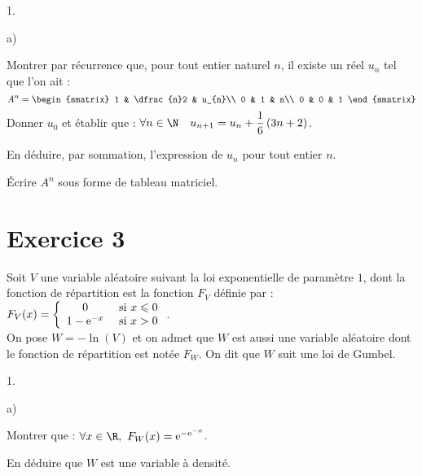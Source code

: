 \documentclass[11pt]{article}%
\begin{document}
\begin{noliste}{1.}
\item
  \begin{noliste}{a)}
    \setlength{\itemsep}{2mm}
  \item Montrer par récurrence que, pour tout entier naturel $n$, il
    existe un réel $u_{n}$ tel que l'on ait :
    \[
    A^{n} = 
    \begin{smatrix}
      1 & \dfrac{n}2 & u_{n}\\
      0 & 1 & n\\
      0 & 0 & 1
    \end{smatrix}
    \]
    Donner $u_{0}$ et établir que : \quad $\forall n \in \N \quad u_{n + 1}
    = u_{n} + \dfrac{1}{6}\left(3n + 2\right)$.
  \item En déduire, par sommation, l'expression de $u_{n}$ pour tout
    entier $n$.
  \item Écrire $A^{n}$ sous forme de tableau matriciel.
  \end{noliste}
\end{noliste}


\newpage


\section*{Exercice 3}

\noindent
Soit $V$ une variable aléatoire suivant la loi exponentielle de
paramètre $1$, dont la fonction de répartition est la fonction $F_{V}$
définie par : $F_{V}(x) = \left\{
\begin{array}{cl}
0 & \hbox{ si } x \leqslant 0\\
1-\text{e}^{-x} & \hbox{ si } x>0
\end{array}
\right.$.\\
On pose $W = -\ln(V)$ et on admet que $W$ est aussi une variable
aléatoire dont le fonction de répartition est notée $F_{W}$. On dit
que $W$ suit une loi de Gumbel.
\begin{noliste}{1.}
  \setlength{\itemsep}{4mm}
\item
  \begin{noliste}{a)}
    \setlength{\itemsep}{2mm}
  \item Montrer que : $\forall x \in \R, \ F_{W}(x) =
    \ee^{-\ee^{-x}}$.
  \item En déduire que $W$ est une variable à densité.
  \end{noliste}
\end{noliste}
\end{document}
